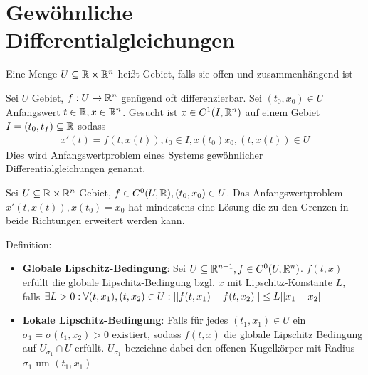 \begin{satz}
	
\end{satz}

\pagebreak

\section{Gewöhnliche Differentialgleichungen}

\begin{definition}[Gebiet]
	Eine Menge $U \subseteq \mathbb{R} \times \mathbb{R}^n$ heißt Gebiet, falls sie offen und zusammenhängend ist
\end{definition}

\begin{definition}
	Sei $U$ Gebiet, $f : U \rightarrow \mathbb{R}^n$ genügend oft differenzierbar. Sei $(t_0, x_0) \in U$ Anfangswert $t \in \mathbb{R}, x \in \mathbb{R}^n$. Gesucht ist $x \in C^{1}(I,\mathbb{R}^n)$ auf einem Gebiet $I = (t_0, t_f) \subseteq \mathbb{R}$ sodass 
	\begin{align*}
		x'(t) = f(t, x(t)) , t_0 \in I, x(t_0) x_0, (t,x(t)) \in U
	\end{align*}
	Dies wird Anfangswertproblem eines Systems gewöhnlicher Differentialgleichungen genannt.
\end{definition}

\begin{satz}
	Sei $U \subseteq \mathbb{R} \times \mathbb{R}^n$ Gebiet, $f \in C^{0}(U,\mathbb{R}), (t_0, x_0) \in U$. Das Anfangswertproblem $x'(t,x(t)), x(t_0) = x_0$ hat mindestens eine Lösung die zu den Grenzen in beide Richtungen erweitert werden kann.
\end{satz}

\begin{definition}
	Definition:
	\begin{itemize}[noitemsep]
		\item \textbf{Globale Lipschitz-Bedingung}: Sei $U \subseteq \mathbb{R}^{n+1}, f \in C^{0}(U,\mathbb{R}^n)$. $f(t,x)$ erfüllt die globale Lipschitz-Bedingung bzgl. $x$ mit Lipschitz-Konstante $L$, falls $\exists L > 0 : \forall (t, x_1),(t, x_2) \in U : ||f(t,x_1) - f(t,x_2)|| \leq L ||x_1 - x_2||$
		\item \textbf{Lokale Lipschitz-Bedingung}: Falls für jedes $(t_1,x_1) \in U$ ein $\sigma_1 = \sigma(t_1,x_2) > 0$ existiert, sodass $f(t,x)$ die globale Lipschitz Bedingung auf $U_{\sigma_1} \cap U$ erfüllt. $U_{\sigma_1}$ bezeichne dabei den offenen Kugelkörper mit Radius $\sigma_1$ um $(t_1,x_1)$
	\end{itemize}
\end{definition}

